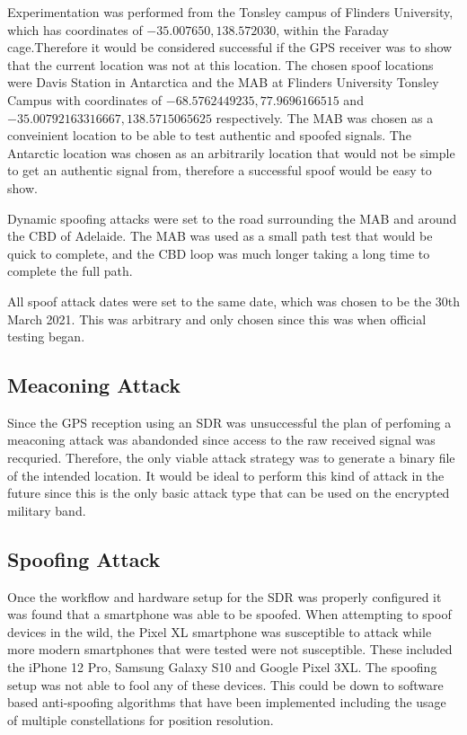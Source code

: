 Experimentation was performed from the Tonsley campus of Flinders University, which has coordinates of $-35.007650, 138.572030$, within the Faraday cage.Therefore it would
be considered successful if the GPS receiver was to show that the current location was not at this location. The chosen spoof locations were Davis Station in
Antarctica and the MAB at Flinders University Tonsley Campus with coordinates of $-68.5762449235, 77.9696166515$ and $-35.00792163316667, 138.5715065625$ respectively.
The MAB was chosen as a conveinient location to be able to test authentic and spoofed signals. The Antarctic location was chosen as an arbitrarily location that would
not be simple to get an authentic signal from, therefore a successful spoof would be easy to show.

Dynamic spoofing attacks were set to the road surrounding the MAB and around the CBD of Adelaide. The MAB was used as a small path test that would be quick to complete,
and the CBD loop was much longer taking a long time to complete the full path.


All spoof attack dates were set to the same date, which was chosen to be
the 30th March 2021. This was arbitrary and only chosen since this was when official testing began.

\subsection{Meaconing Attack}
Since the GPS reception using an SDR was unsuccessful the plan of perfoming a meaconing attack was abandonded since access to the raw received signal was recquried.
Therefore, the only viable attack strategy was to generate a binary file of the intended location. It would be ideal to perform this kind of attack in the future since
this is the only basic attack type that can be used on the encrypted military band.

\subsection{Spoofing Attack}
Once the workflow and hardware setup for the SDR was properly configured it was found that a smartphone was able to be spoofed.
When attempting to spoof devices in the wild, the Pixel XL smartphone was susceptible to attack while more modern smartphones that were tested were not susceptible. These
included the iPhone 12 Pro, Samsung Galaxy S10 and Google Pixel 3XL. The spoofing setup was not able to fool any of these devices. This could be down to software based
anti-spoofing algorithms that have been implemented including the usage of multiple constellations for position resolution.

